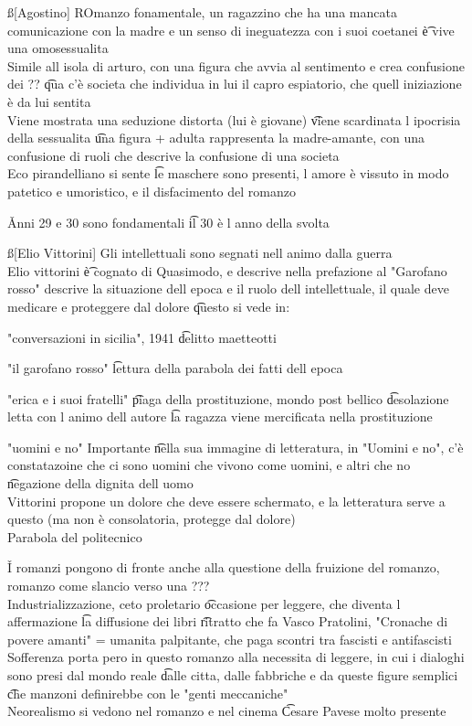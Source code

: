 \documentclass[12pt]{article}
\begin{document}
\ss[Agostino]
ROmanzo fonamentale, un ragazzino che ha una mancata comunicazione con la madre e un senso di ineguatezza con i suoi coetanei \t è vive una omosessualita \\
Simile all isola di arturo, con una figura che avvia al sentimento e crea confusione dei ?? \t qua c'è societa che individua in lui il capro espiatorio, che quell iniziazione è da lui sentita \\
Viene mostrata una seduzione distorta (lui è giovane) \t viene scardinata l ipocrisia della sessualita \t una figura + adulta rappresenta la madre-amante, con una confusione di ruoli che descrive la confusione di una societa \\
Eco pirandelliano si sente \t le maschere sono presenti, l amore è vissuto in modo patetico e umoristico, e il disfacimento del romanzo

\v

Anni 29 e 30 sono fondamentali \t il 30 è l anno della svolta

\ss[Elio Vittorini]
Gli intellettuali sono segnati nell animo dalla guerra \\
Elio vittorini \t è cognato di Quasimodo, e descrive nella prefazione al "Garofano rosso" descrive la situazione dell epoca e il ruolo dell intellettuale, il quale deve medicare e proteggere dal dolore \t questo si vede in:
\bi
  \item "conversazioni in sicilia", 1941 \t delitto maetteotti
  \item "il garofano rosso" \t lettura della parabola dei fatti dell epoca
  \item "erica e i suoi fratelli" \t piaga della prostituzione, mondo post bellico  \t desolazione letta con l animo dell autore \t la ragazza viene mercificata nella prostituzione
  \item "uomini e no"
\ei
Importante \t nella sua immagine di letteratura, in "Uomini e no", c'è constatazoine che ci sono uomini che vivono come uomini, e altri che no \t negazione della dignita dell uomo \\
Vittorini propone un dolore che deve essere schermato, e la letteratura serve a questo (ma non è consolatoria, protegge dal dolore) \\
Parabola del politecnico

\v

I romanzi pongono di fronte anche alla questione della fruizione del romanzo, romanzo come slancio verso una ??? \\
Industrializzazione, ceto proletario \t occasione per leggere, che diventa l affermazione \t la diffusione dei libri \t ritratto che fa Vasco Pratolini, "Cronache di povere amanti" = umanita palpitante, che paga scontri tra fascisti e antifascisti \\
Sofferenza porta pero in questo romanzo alla necessita di leggere, in cui i dialoghi sono presi dal mondo reale \t dalle citta, dalle fabbriche e da queste figure semplici \t che manzoni definirebbe con le "genti meccaniche" \\
Neorealismo si vedono nel romanzo e nel cinema \t Cesare Pavese molto presente
\end{document}

